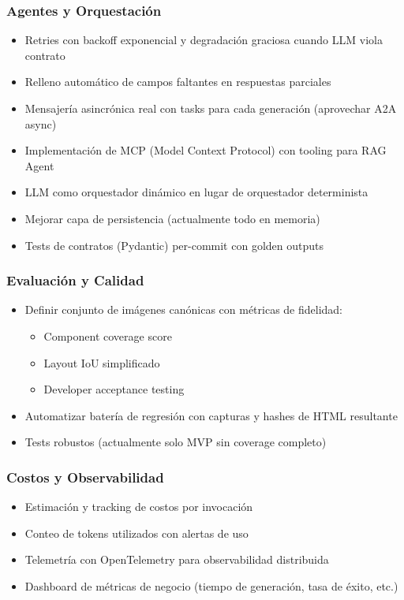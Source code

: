 \documentclass[12pt,a4paper]{article}
\begin{document}
\subsubsection{Agentes y Orquestación}

\begin{itemize}
    \item Retries con backoff exponencial y degradación graciosa cuando LLM viola contrato
    \item Relleno automático de campos faltantes en respuestas parciales
    \item Mensajería asincrónica real con tasks para cada generación (aprovechar A2A async)
    \item Implementación de MCP (Model Context Protocol) con tooling para RAG Agent
    \item LLM como orquestador dinámico en lugar de orquestador determinista
    \item Mejorar capa de persistencia (actualmente todo en memoria)
    \item Tests de contratos (Pydantic) per-commit con golden outputs
\end{itemize}

\subsubsection{Evaluación y Calidad}

\begin{itemize}
    \item Definir conjunto de imágenes canónicas con métricas de fidelidad:
    \begin{itemize}
        \item Component coverage score
        \item Layout IoU simplificado
        \item Developer acceptance testing
    \end{itemize}
    \item Automatizar batería de regresión con capturas y hashes de HTML resultante
    \item Tests robustos (actualmente solo MVP sin coverage completo)
\end{itemize}

\subsubsection{Costos y Observabilidad}

\begin{itemize}
    \item Estimación y tracking de costos por invocación
    \item Conteo de tokens utilizados con alertas de uso
    \item Telemetría con OpenTelemetry para observabilidad distribuida
    \item Dashboard de métricas de negocio (tiempo de generación, tasa de éxito, etc.)
\end{itemize}
\end{document}
